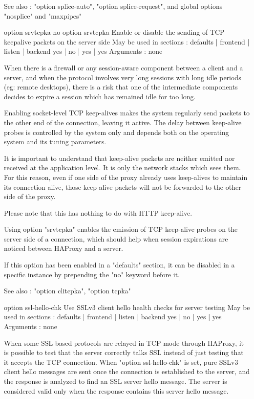   See also : "option splice-auto", "option splice-request", and global options
             "nosplice" and "maxpipes"


option srvtcpka
no option srvtcpka
  Enable or disable the sending of TCP keepalive packets on the server side
  May be used in sections :   defaults | frontend | listen | backend
                                 yes   |    no    |   yes  |   yes
  Arguments : none

  When there is a firewall or any session-aware component between a client and
  a server, and when the protocol involves very long sessions with long idle
  periods (eg: remote desktops), there is a risk that one of the intermediate
  components decides to expire a session which has remained idle for too long.

  Enabling socket-level TCP keep-alives makes the system regularly send packets
  to the other end of the connection, leaving it active. The delay between
  keep-alive probes is controlled by the system only and depends both on the
  operating system and its tuning parameters.

  It is important to understand that keep-alive packets are neither emitted nor
  received at the application level. It is only the network stacks which sees
  them. For this reason, even if one side of the proxy already uses keep-alives
  to maintain its connection alive, those keep-alive packets will not be
  forwarded to the other side of the proxy.

  Please note that this has nothing to do with HTTP keep-alive.

  Using option "srvtcpka" enables the emission of TCP keep-alive probes on the
  server side of a connection, which should help when session expirations are
  noticed between HAProxy and a server.

  If this option has been enabled in a "defaults" section, it can be disabled
  in a specific instance by prepending the "no" keyword before it.

  See also : "option clitcpka", "option tcpka"


option ssl-hello-chk
  Use SSLv3 client hello health checks for server testing
  May be used in sections :   defaults | frontend | listen | backend
                                 yes   |    no    |   yes  |   yes
  Arguments : none

  When some SSL-based protocols are relayed in TCP mode through HAProxy, it is
  possible to test that the server correctly talks SSL instead of just testing
  that it accepts the TCP connection. When "option ssl-hello-chk" is set, pure
  SSLv3 client hello messages are sent once the connection is established to
  the server, and the response is analyzed to find an SSL server hello message.
  The server is considered valid only when the response contains this server
  hello message.

